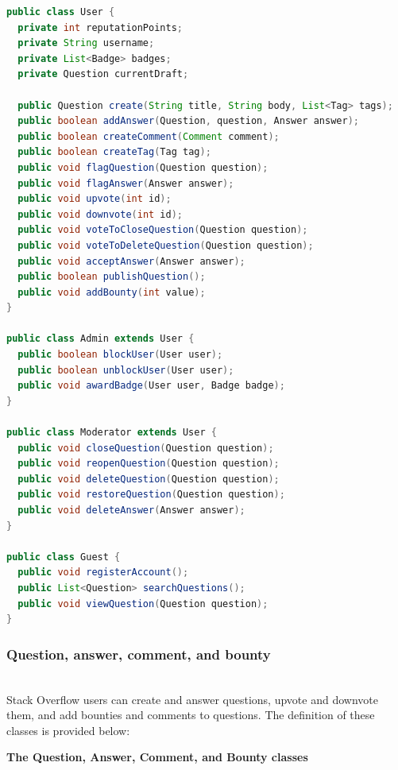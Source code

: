 \begin{lstlisting}[language=Java]
public class User {
  private int reputationPoints;
  private String username;
  private List<Badge> badges;
  private Question currentDraft;

  public Question create(String title, String body, List<Tag> tags);
  public boolean addAnswer(Question, question, Answer answer);
  public boolean createComment(Comment comment);
  public boolean createTag(Tag tag);
  public void flagQuestion(Question question);
  public void flagAnswer(Answer answer);
  public void upvote(int id);
  public void downvote(int id);
  public void voteToCloseQuestion(Question question);
  public void voteToDeleteQuestion(Question question);
  public void acceptAnswer(Answer answer);
  public boolean publishQuestion();
  public void addBounty(int value);
}

public class Admin extends User {
  public boolean blockUser(User user);
  public boolean unblockUser(User user);
  public void awardBadge(User user, Badge badge);
}

public class Moderator extends User {
  public void closeQuestion(Question question);
  public void reopenQuestion(Question question);
  public void deleteQuestion(Question question);
  public void restoreQuestion(Question question);
  public void deleteAnswer(Answer answer);
}

public class Guest {
  public void registerAccount();
  public List<Question> searchQuestions();
  public void viewQuestion(Question question);
}
\end{lstlisting}

\subsubsection{Question, answer, comment, and bounty}\label{3VyJ6YosyGRVL7Tb2VQ2W}
\\
Stack Overflow users can create and answer questions, upvote and downvote them, and add bounties and comments to questions. The definition of these classes is provided below:

\textbf{The Question, Answer, Comment, and Bounty classes}

